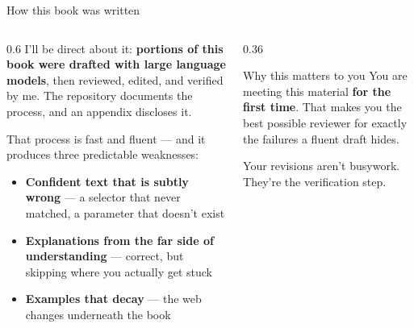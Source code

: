 \documentclass[9pt,aspectratio=169]{beamer}
\begin{document}
\begin{frame}{How this book was written}
    \begin{columns}[T]
        \begin{column}{0.6\textwidth}
            I'll be direct about it: \textbf{portions of this book were drafted with large language models}, then reviewed, edited, and verified by me. The repository documents the process, and an appendix discloses it.

            \vspace{0.6em}

            That process is fast and fluent --- and it produces three predictable weaknesses:
            \begin{itemize}\small
                \item \textcolor{tab-red}{\textbf{Confident text that is subtly wrong}} --- a selector that never matched, a parameter that doesn't exist
                \item \textcolor{tab-orange}{\textbf{Explanations from the far side of understanding}} --- correct, but skipping where you actually get stuck
                \item \textcolor{tab-blue}{\textbf{Examples that decay}} --- the web changes underneath the book
            \end{itemize}
        \end{column}
        \begin{column}{0.36\textwidth}
            \begin{alertblock}{Why this matters to you}
                \footnotesize You are meeting this material \textbf{for the first time}. That makes you the best possible reviewer for exactly the failures a fluent draft hides.
                \vspace{0.3em}

                Your revisions aren't busywork. They're the verification step.
            \end{alertblock}
        \end{column}
    \end{columns}
\end{frame}
\end{document}
